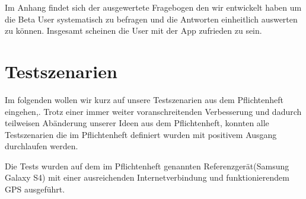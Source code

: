 \documentclass{scrartcl}
\begin{document}
		Im Anhang findet sich der ausgewertete Fragebogen den wir entwickelt haben um die Beta User systematisch zu befragen und die Antworten einheitlich auswerten zu können. Insgesamt scheinen die User mit der App zufrieden zu sein.

\newpage
\section{Testszenarien}
Im folgenden wollen wir kurz auf unsere Testszenarien aus dem Pflichtenheft eingehen,.
Trotz einer immer weiter voranschreitenden Verbesserung und dadurch teilweisen Abänderung unserer Ideen aus dem Pflichtenheft, konnten alle Testszenarien die im Pflichtenheft definiert wurden mit positivem Ausgang durchlaufen werden.

Die Tests wurden auf dem im Pflichtenheft genannten Referenzgerät(Samsung Galaxy S4) mit einer ausreichenden Internetverbindung und funktionierendem GPS ausgeführt. \newline
\end{document}

